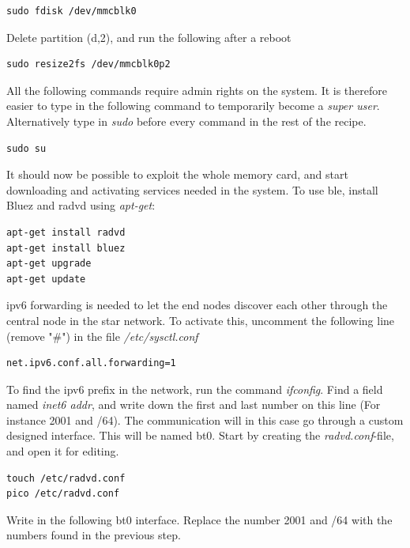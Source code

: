 \begin{verbatim}
sudo fdisk /dev/mmcblk0
\end{verbatim}

Delete partition (d,2), and run the following after a reboot

\begin{verbatim}
sudo resize2fs /dev/mmcblk0p2
\end{verbatim}

\noindent All the following commands require admin rights on the system. It is therefore easier to type in the following command to temporarily become a \textit{super user}. Alternatively type in \textit{sudo} before every command in the rest of the recipe.

\begin{verbatim}
sudo su
\end{verbatim} 

\noindent It should now be possible to exploit the whole memory card, and start downloading and activating services needed in the system. To use \gls{ble}, install Bluez and radvd using \textit{apt-get}:

\begin{verbatim}
apt-get install radvd
apt-get install bluez
apt-get upgrade
apt-get update
\end{verbatim}

\noindent \gls{ipv6} forwarding is needed to let the end nodes discover each other through the central node in the star network. To activate this, uncomment the following line (remove "\#") in the file \textit{/etc/sysctl.conf}

\begin{verbatim}
net.ipv6.conf.all.forwarding=1
\end{verbatim}

\noindent To find the \gls{ipv6} prefix in the network, run the command \textit{ifconfig}. Find a field named \textit{inet6 addr}, and write down the first and last number on this line (For instance 2001 and /64). 
The communication will in this case go through a custom designed interface. This will be named bt0. Start by creating the \textit{radvd.conf}-file, and open it for editing. 

\begin{verbatim}
touch /etc/radvd.conf
pico /etc/radvd.conf
\end{verbatim} 


\noindent Write in the following bt0 interface. Replace the number 2001 and /64 with the numbers found in the previous step. 

